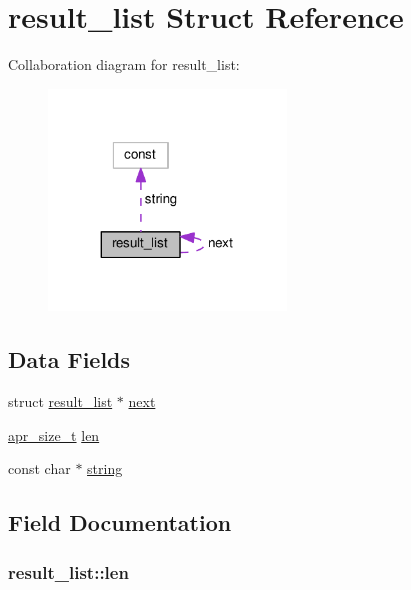 \hypertarget{structresult__list}{}\section{result\+\_\+list Struct Reference}
\label{structresult__list}


Collaboration diagram for result\+\_\+list\+:
\nopagebreak
\begin{figure}[H]
\begin{center}
\leavevmode
\includegraphics[width=179pt]{structresult__list__coll__graph}
\end{center}
\end{figure}
\subsection*{Data Fields}
\begin{DoxyCompactItemize}
\item 
struct \hyperlink{structresult__list}{result\+\_\+list} $\ast$ \hyperlink{structresult__list_ad0d01340209596dfd59262c83eb639b2}{next}
\item 
\hyperlink{group__apr__platform_gaaa72b2253f6f3032cefea5712a27540e}{apr\+\_\+size\+\_\+t} \hyperlink{structresult__list_a7c79c1d23a7f4affec4e95d1dceb9709}{len}
\item 
const char $\ast$ \hyperlink{structresult__list_a8d69e645e5b5901338224d0209c3dd58}{string}
\end{DoxyCompactItemize}


\subsection{Field Documentation}
\subsubsection[{\texorpdfstring{len}{len}}]{ result\+\_\+list\+::len}\hypertarget{structresult__list_a7c79c1d23a7f4affec4e95d1dceb9709}{}\label{structresult__list_a7c79c1d23a7f4affec4e95d1dceb9709}
